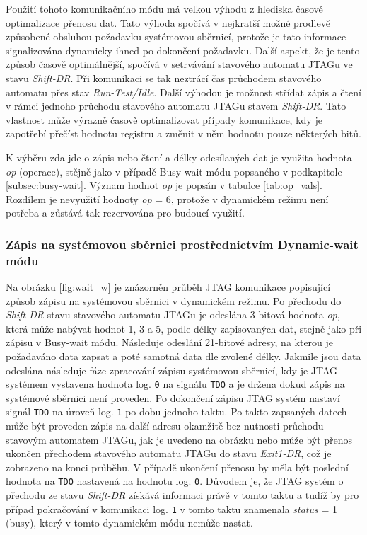 Použití tohoto komunikačního módu má velkou výhodu z hlediska časové optimalizace přenosu dat. Tato výhoda spočívá v nejkratší možné prodlevě způsobené obsluhou požadavku systémovou sběrnicí, protože je tato informace signalizována dynamicky ihned po dokončení požadavku. Další aspekt, že je tento způsob časově optimálnější, spočívá v setrvávání stavového automatu JTAGu ve stavu \textit{Shift-DR}. Při komunikaci se tak neztrácí čas průchodem stavového automatu přes stav \textit{Run-Test/Idle}. Další výhodou je možnost střídat zápis a čtení v rámci jednoho průchodu stavového automatu JTAGu stavem \textit{Shift-DR}. Tato vlastnost může výrazně časově optimalizovat případy komunikace, kdy je zapotřebí přečíst hodnotu registru a změnit v něm hodnotu pouze některých bitů.

K výběru zda jde o zápis nebo čtení a délky odesílaných dat je využita hodnota \textit{op} (operace), stějně jako v případě Busy-wait módu popsaného v podkapitole \ref{subsec:busy-wait}. Význam hodnot \textit{op} je popsán v tabulce \ref{tab:op_vals}. Rozdílem je nevyužití hodnoty \textit{op} = 6, protože v dynamickém režimu není potřeba a zůstává tak rezervována pro budoucí využití.

\subsubsection{Zápis na systémovou sběrnici prostřednictvím Dynamic-wait módu} 
Na obrázku \ref{fig:wait_w} je znázorněn průběh \acs{JTAG} komunikace popisující způsob zápisu na systémovou sběrnici v dynamickém  režimu. Po přechodu do \textit{Shift-DR} stavu stavového automatu JTAGu je odeslána 3-bitová hodnota \textit{op}, která může nabývat hodnot 1, 3 a 5, podle délky zapisovaných dat, stejně jako při zápisu v Busy-wait módu. Následuje odeslání 21-bitové adresy, na kterou je požadaváno data zapsat a poté samotná data dle zvolené délky. Jakmile jsou data odeslána následuje fáze zpracování zápisu systémovou sběrnicí, kdy je \acs{JTAG} systémem vystavena hodnota log. \texttt{0} na signálu \texttt{\acs{TDO}} a je držena dokud zápis na systémové sběrnici není proveden. Po dokončení zápisu \acs{JTAG} systém nastaví signál \texttt{\acs{TDO}} na úroveň log. \texttt{1} po dobu jednoho taktu. Po takto zapsaných datech může být proveden zápis na další adresu okamžitě bez nutnosti průchodu stavovým automatem JTAGu, jak je uvedeno na obrázku nebo může být přenos ukončen přechodem stavového automatu JTAGu do stavu \textit{Exit1-DR}, což je zobrazeno na konci průběhu. V případě ukončení přenosu by měla být poslední hodnota na \texttt{\acs{TDO}} nastavená na hodnotu log. \texttt{0}. Důvodem je, že \acs{JTAG} systém o přechodu ze stavu \textit{Shift-DR} získává informaci právě v tomto taktu a tudíž by pro případ pokračování v komunikaci log. \texttt{1} v tomto taktu znamenala \textit{status} = 1 (busy), který v tomto dynamickém módu nemůže nastat.


